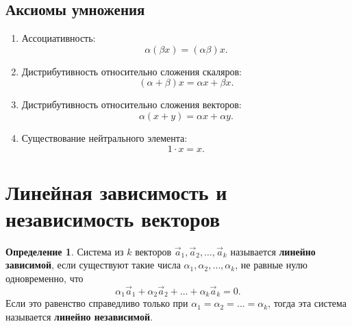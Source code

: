 \documentclass[a5paper, 11pt]{extbook}
\theoremstyle{definition}
\theoremstyle{definition}
\newtheorem{definition}{Определение}[chapter]
\begin{document}
\subsection{Аксиомы умножения}

\begin{enumerate}
    \item Ассоциативность:
          \[
              \alpha (\beta x) = (\alpha \beta)x.
          \]
    \item Дистрибутивность относительно сложения скаляров:
          \[
              (\alpha + \beta)x = \alpha x + \beta x.
          \]
    \item Дистрибутивность относительно сложения векторов:
          \[
              \alpha (x + y) = \alpha x + \alpha y.
          \]
    \item Существование нейтрального элемента:
          \[
              1 \cdot x  = x.
          \]
\end{enumerate}

\section{Линейная зависимость и независимость векторов}

\begin{definition}
    Система из \(k\) векторов \(\vec{a}_1, \vec{a}_2, \ldots, \vec{a}_k\) называется \textbf{линейно зависимой}, если существуют такие числа \(\alpha_1, \alpha_2, \ldots, \alpha_k\), не равные нулю одновременно, что
    \begin{equation*}
        \alpha_1 \vec{a}_1 + \alpha_2 \vec{a}_2 + \ldots + \alpha_k \vec{a}_k = 0.
    \end{equation*}
    Если это равенство справедливо только при \(\alpha_1 = \alpha_2 = \ldots = \alpha_k\), тогда эта система называется \textbf{линейно независимой}.
\end{definition}



\end{document}
